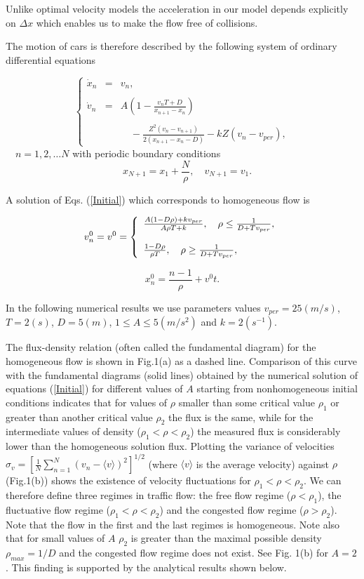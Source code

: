 Unlike optimal velocity models \cite{Sug}
the acceleration in our model depends explicitly
on $\Delta x$ which enables us to make the flow free of collisions.

The motion of cars is therefore described by the following system of ordinary
differential equations

\begin{equation} 
\label{Initial} 
\left\{ 
\begin{array}{lcl} 
\dot{x}_n & = & v_n, \\ 
&&\\ 
\dot{v}_n & = & A(1-\frac{v_nT+D}{x_{n+1}-x_n})\\ 
&&\\ 
&& \quad-\frac{Z^2(v_n-v_{n+1})}{2(x_{n+1}-x_n-D)}-kZ(v_n-v_{per}), 
\end{array} 
\right.
\end{equation}
$\quad n=1,2,\ldots N$ with periodic boundary conditions
$$
\quad x_{N+1} = x_1 +\frac{N}{\rho},\quad v_{N+1}=v_1.
$$

A solution of Eqs. (\ref{Initial}) which corresponds to homogeneous
flow is

\begin{equation}
\label{Hom_Sol}
v_n^0 = v^0 =
\left\{
\begin{array}{l}
\frac{A(1-D\rho)+kv_{per}}{A\rho T+k},\quad \rho\leq\frac{1}{D+Tv_{per}},\cr
\cr
\frac{1-D\rho}{\rho T},\quad \rho\geq\frac{1}{D+Tv_{per}},
\end{array}
\right.
\end{equation}

$$
x_n^0=\frac{n-1}{\rho}+v^0t.
$$

In the following numerical results we use parameters values
$v_{per}=25(m/s)$, $T=2(s)$, $D=5(m)$,
$1\leq A\leq 5 (m/s^2)$ and $k=2(s^{-1})$.

The flux-density relation (often called the fundamental diagram) for the
homogeneous flow is shown in Fig.1(a) as a dashed line. Comparison of this
curve with the fundamental diagrams (solid lines) obtained by the numerical
solution of equations (\ref{Initial}) for different values of $A$ starting
from nonhomogeneous initial conditions indicates that for values of $\rho$
smaller than some critical value $\rho_1$ or greater than another critical
value $\rho_2$ the flux is the same, while for the intermediate values of
density ($\rho_1<\rho<\rho_2$) the measured flux is considerably lower than the
homogeneous solution flux. Plotting the variance of velocities
$\sigma_v=[\frac{1}{N}\sum\limits_{n=1}^N(v_n- \langle v\rangle)^2]^{1/2}$
(where $\langle v\rangle$ is the average velocity) against $\rho$ (Fig.1(b))
shows the existence of velocity fluctuations for $\rho_1<\rho<\rho_2$. We can
therefore define three regimes in traffic flow: the free flow regime
($\rho<\rho_1$), the fluctuative flow regime ($\rho_1<\rho<\rho_2$) and the
congested flow regime ($\rho>\rho_2$). Note that the flow in the first and the
last regimes is homogeneous. Note also that for small values of $A$ $\rho_2$
is greater than the maximal possible density $\rho_{max}=1/D$ and the
congested flow regime does not exist. See Fig. 1(b) for $A=2$. This finding is
supported by the analytical results shown below.

